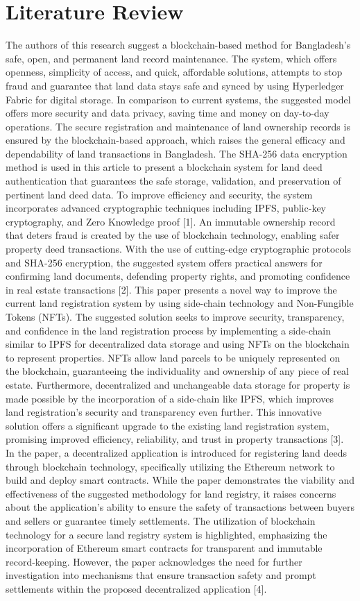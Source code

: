 \documentclass[conference]{IEEEtran}
\begin{document}
\section{Literature Review}
The authors of this research suggest a blockchain-based method for Bangladesh's safe, open, and permanent land record maintenance. The system, which offers openness, simplicity of access, and quick, affordable solutions, attempts to stop fraud and guarantee that land data stays safe and synced by using Hyperledger Fabric for digital storage. In comparison to current systems, the suggested model offers more security and data privacy, saving time and money on day-to-day operations. The secure registration and maintenance of land ownership records is ensured by the blockchain-based approach, which raises the general efficacy and dependability of land transactions in Bangladesh. The SHA-256 data encryption method is used in this article to present a blockchain system for land deed authentication that guarantees the safe storage, validation, and preservation of pertinent land deed data. To improve efficiency and security, the system incorporates advanced cryptographic techniques including IPFS, public-key cryptography, and Zero Knowledge proof [1]. 
An immutable ownership record that deters fraud is created by the use of blockchain technology, enabling safer property deed transactions. With the use of cutting-edge cryptographic protocols and SHA-256 encryption, the suggested system offers practical answers for confirming land documents, defending property rights, and promoting confidence in real estate transactions [2]. 
This paper presents a novel way to improve the current land registration system by using side-chain technology and Non-Fungible Tokens (NFTs). The suggested solution seeks to improve security, transparency, and confidence in the land registration process by implementing a side-chain similar to IPFS for decentralized data storage and using NFTs on the blockchain to represent properties. NFTs allow land parcels to be uniquely represented on the blockchain, guaranteeing the individuality and ownership of any piece of real estate. Furthermore, decentralized and unchangeable data storage for property is made possible by the incorporation of a side-chain like IPFS, which improves land registration's security and transparency even further. This innovative solution offers a significant upgrade to the existing land registration system, promising improved efficiency, reliability, and trust in property transactions [3].
In the paper, a decentralized application is introduced for registering land deeds through blockchain technology, specifically utilizing the Ethereum network to build and deploy smart contracts. While the paper demonstrates the viability and effectiveness of the suggested methodology for land registry, it raises concerns about the application's ability to ensure the safety of transactions between buyers and sellers or guarantee timely settlements. The utilization of blockchain technology for a secure land registry system is highlighted, emphasizing the incorporation of Ethereum smart contracts for transparent and immutable record-keeping. However, the paper acknowledges the need for further investigation into mechanisms that ensure transaction safety and prompt settlements within the proposed decentralized application [4].
\end{document}
